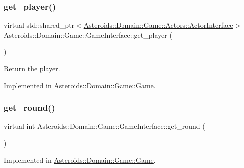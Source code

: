 \subsubsection{\texorpdfstring{get\+\_\+player()}{get\_player()}}
{\footnotesize\ttfamily virtual std\+::shared\+\_\+ptr$<$\hyperlink{classAsteroids_1_1Domain_1_1Game_1_1Actors_1_1ActorInterface}{Asteroids\+::\+Domain\+::\+Game\+::\+Actors\+::\+Actor\+Interface}$>$ Asteroids\+::\+Domain\+::\+Game\+::\+Game\+Interface\+::get\+\_\+player (\begin{DoxyParamCaption}{ }\end{DoxyParamCaption})\hspace{0.3cm}{\ttfamily [pure virtual]}}



Return the player. 



Implemented in \hyperlink{classAsteroids_1_1Domain_1_1Game_1_1Game_ae036a59145a83f0e66e91acce693035b}{Asteroids\+::\+Domain\+::\+Game\+::\+Game}.

\mbox{\label{classAsteroids_1_1Domain_1_1Game_1_1GameInterface_ac8da5febc9e8115eb166fe9238c32772}} 
\subsubsection{\texorpdfstring{get\+\_\+round()}{get\_round()}}
{\footnotesize\ttfamily virtual int Asteroids\+::\+Domain\+::\+Game\+::\+Game\+Interface\+::get\+\_\+round (\begin{DoxyParamCaption}{ }\end{DoxyParamCaption})\hspace{0.3cm}{\ttfamily [pure virtual]}}



Implemented in \hyperlink{classAsteroids_1_1Domain_1_1Game_1_1Game_abc24d11951291f8ceab1d20a6652b46e}{Asteroids\+::\+Domain\+::\+Game\+::\+Game}.

\mbox{\label{classAsteroids_1_1Domain_1_1Game_1_1GameInterface_a8f7ade2512ff188e0647a329acb34848}} 
